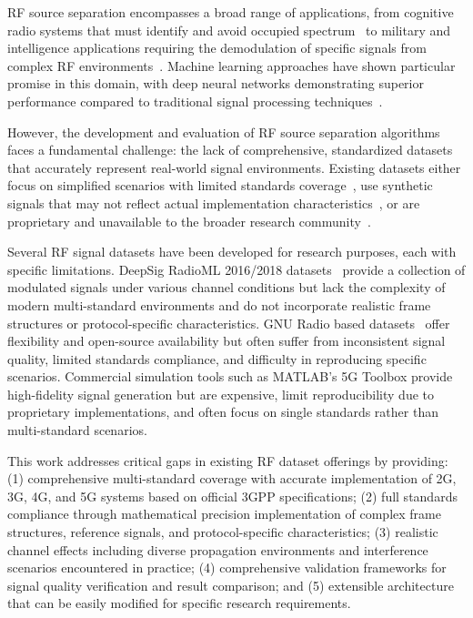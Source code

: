 \documentclass[twocolumn,10pt]{article}
\begin{document}
RF source separation encompasses a broad range of applications, from cognitive radio systems that must identify and avoid occupied spectrum~\cite{haykin2005cognitive} to military and intelligence applications requiring the demodulation of specific signals from complex RF environments~\cite{goldsmith2009breaking}. Machine learning approaches have shown particular promise in this domain, with deep neural networks demonstrating superior performance compared to traditional signal processing techniques~\cite{oshea2017introduction, west2017deep}.

However, the development and evaluation of RF source separation algorithms faces a fundamental challenge: the lack of comprehensive, standardized datasets that accurately represent real-world signal environments. Existing datasets either focus on simplified scenarios with limited standards coverage~\cite{oshea2018over}, use synthetic signals that may not reflect actual implementation characteristics~\cite{oshea2016convolutional}, or are proprietary and unavailable to the broader research community~\cite{rajendran2018deep}.

Several RF signal datasets have been developed for research purposes, each with specific limitations. DeepSig RadioML 2016/2018 datasets~\cite{oshea2016radio, west2017deep} provide a collection of modulated signals under various channel conditions but lack the complexity of modern multi-standard environments and do not incorporate realistic frame structures or protocol-specific characteristics. GNU Radio based datasets~\cite{blossom2004gnu} offer flexibility and open-source availability but often suffer from inconsistent signal quality, limited standards compliance, and difficulty in reproducing specific scenarios. Commercial simulation tools such as MATLAB's 5G Toolbox provide high-fidelity signal generation but are expensive, limit reproducibility due to proprietary implementations, and often focus on single standards rather than multi-standard scenarios.

This work addresses critical gaps in existing RF dataset offerings by providing: (1) comprehensive multi-standard coverage with accurate implementation of 2G, 3G, 4G, and 5G systems based on official 3GPP specifications; (2) full standards compliance through mathematical precision implementation of complex frame structures, reference signals, and protocol-specific characteristics; (3) realistic channel effects including diverse propagation environments and interference scenarios encountered in practice; (4) comprehensive validation frameworks for signal quality verification and result comparison; and (5) extensible architecture that can be easily modified for specific research requirements.
\end{document}
